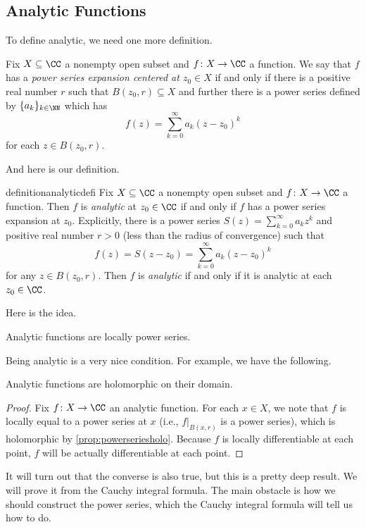 \documentclass[../notes.tex]{subfiles}
\begin{document}
\subsection{Analytic Functions}
To define analytic, we need one more definition.
\begin{definition}
	Fix $X\subseteq\CC$ a nonempty open subset and $f\colon X\to\CC$ a function. We say that $f$ has a \textit{power series expansion centered at $z_0\in X$}
	if and only if there is a positive real number $r$ such that $B(z_0,r)\subseteq X$ and further there is a power series defined by
	$\{a_k\}_{k\in\NN}$ which has
	\[f(z)=\sum_{k=0}^\infty a_k(z-z_0)^k\]
	for each $z\in B(z_0,r)$.
\end{definition}
And here is our definition.
\begin{restatable}[Analytic]{definition}{analyticdefi}
	Fix $X\subseteq\CC$ a nonempty open subset and $f\colon X\to\CC$ a function. Then $f$ is \textit{analytic} at $z_0\in\CC$ if and only if $f$ has a power series expansion at $z_0$. Explicitly, there is a power series $S(z)=\sum_{k=0}^\infty a_kz^k$ and positive real number $r>0$ (less than the radius of convergence) such that
	\[f(z)=S(z-z_0)=\sum_{k=0}^\infty a_k(z-z_0)^k\]
	for any $z\in B(z_0,r)$. Then $f$ is \textit{analytic} if and only if it is analytic at each $z_0\in\CC$.
\end{restatable}
\noindent Here is the idea.
\begin{idea}
	Analytic functions are locally power series.
\end{idea}
Being analytic is a very nice condition. For example, we have the following.
\begin{proposition} \label{prop:anaisholo}
	Analytic functions are holomorphic on their domain.
\end{proposition}
\begin{proof}
	Fix $f\colon X\to\CC$ an analytic function. For each $x\in X$, we note that $f$ is locally equal to a power series at $x$ (i.e., $f|_{B(x,r)}$ is a power series), which is holomorphic by \autoref{prop:powerseriesholo}. Because $f$ is locally differentiable at each point, $f$ will be actually differentiable at each point.
\end{proof}
\begin{remark}
	It will turn out that the converse is also true, but this is a pretty deep result. We will prove it from the Cauchy integral formula. The main obstacle is how we should construct the power series, which the Cauchy integral formula will tell us how to do.
\end{remark}
\end{document}
